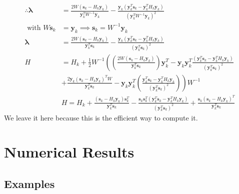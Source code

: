 \documentclass[12pt]{report}
\begin{document}
$$
	\begin{aligned}
		\therefore \bm{\lambda}  & =\frac{2 W\left(\bm{s}_{k}-H_{k} \bm{y}_k\right)}{\bm{y}_{k}^{T} W^{-1} \bm{y}_{k}}-\frac{\bm{y}_{k}\left(\bm y_{k}^{T} {\bm s}_{k} - \bm{y}_{k}^{T} H_{k} \bm{y}_{k} \right)}{\left(\bm{y}_{k}^{T} W^{-1} \bm{y}_{k}\right)^{2}}                                                                    \\
		\text { with } W\bm{s}_k & = \bm y_{k} \implies {\bm s_{k}}=W^{-1} \bm{y}_k                                                                                                                                                                                                                                                     \\
		\bm{\lambda}             & =\frac{2 W\left({\bm{s}_k}-H_{k} \bm{y}_k\right)}{\bm y_{k}^{T}\bm s_{k}}-\frac{\bm{y}_{k}\left(\bm y_{k}^{T} \bm s_{k}-\bm{y}_{k}^{T} H_{k} \bm{y}_{k}\right)}{\left(\bm y_{k}^{T} \bm s_{k}\right)^{2}}                                                                                            \\
		H                        & =  H_{k}+\frac{1}{2} W^{-1} \left(\left(\frac{2 W\left(\bm{s}_k-H_{k} \bm{y}_k\right)}{\bm y_{k}^{T} \bm s_{k}}\right) \bm y_{k}^{T}- \bm{y}_{k}\bm{y}_k^{T}\frac{\left(\bm y_{k}^{T} \bm s_{k}-\bm y_{k}^{T} H_{k} \bm y_{k}\right)}{\left(\bm y_{k}^{T}\bm s_{k}\right)^{2}}               \right. \\
		                         & \left.+\frac{2 \bm y_{k}\left(\bm{s}_k-H_{k} \bm y_{k}\right)^{T} W}{\bm y_{k}^{T} \bm s_{k}}-\bm{y}_k \bm{y}_{k}^{T}\left(\frac{\bm{y}_{k}^{T} \bm s_{k}-\bm{y}_{k}^{T} H_{k} \bm{y}_{k}}{\left(\bm{y}_{k}^{T} \bm{s}_{k}\right)^{2}}\right)\right){W^{-1}}                                         \\
		                         & H=H_{k}+ \frac{\left(\bm{s}_k-H_{k} \bm{y}_k\right) \bm{s}_{k}^{T}}{\bm{y}_{k}^{T} \bm s_{k}}-\frac{\bm s_{k} \bm s_{k}^{T}\left(\bm y_{k}^{T} \bm s_{k}-\bm y_{k}^{T} H_{k} \bm y_{k}\right)}{\left(\bm y_{k}^{T}  \bm s_{k}\right)^{2}}
		+\frac{\bm{s}_k\left(\bm s_{k}-H_{k} \bm y_{k}\right)^{T}}{\bm y_{k}^{T} \bm s_{k}}
	\end{aligned}
$$
We leave it here because this is the efficient way to compute it.


\section{Numerical Results}
\subsection{Examples}
\end{document}
